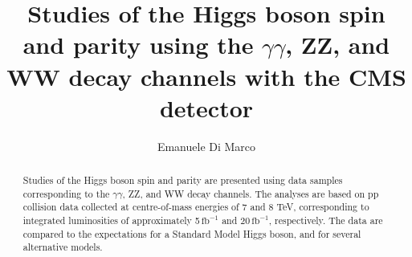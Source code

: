 \documentclass[3p,times,twocolumn]{elsarticle}
\newcommand{\fbinv}{\ensuremath{\,\mathrm{fb}^\mathrm{-1}}}
\begin{document}
\begin{frontmatter}



\dochead{}

\title{Studies of the Higgs boson spin and parity using the $\gamma\gamma$, ZZ, and WW decay channels with the CMS detector}


\author{Emanuele Di Marco}

\address{CERN, CH-1211 Geneva 23, Switzerland}

\begin{abstract}
Studies of the Higgs boson spin and parity are presented using data
samples corresponding to the $\gamma\gamma$, ZZ, and WW decay
channels. The analyses are based on pp collision data collected at
centre-of-mass energies of 7 and 8 TeV, corresponding to integrated
luminosities of approximately 5$\fbinv$ and 20$\fbinv$, respectively. The data
are compared to the expectations for a Standard Model Higgs boson, and
for several alternative models.
\end{abstract}

\begin{keyword}
  

\end{keyword}

\end{frontmatter}
\end{document}
